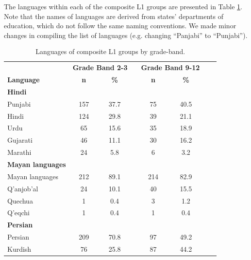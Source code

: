 \documentclass [PhD] {uclathes}
\begin{document}
The languages within each of the composite L1 groups are presented in Table \ref{lang_grp}. Note that the names of languages are derived from states’ departments of education, which do not follow the same naming conventions. We made minor changes in compiling the list of languages (e.g. changing “Panjabi” to “Punjabi”). 

\begin{table}[htbp]
\centering
\caption{\label{lang_grp} Languages of composite L1 groups by grade-band.}
\small  %
\begin{tabular}{lccccccc}
\toprule
    & \multicolumn{2}{c}{\textbf{Grade Band 2-3}} & \multicolumn{1}{c}{ } & \multicolumn{2}{c}{\textbf{Grade Band 9-12}} \\
    \cline{2-3}
    \cline{5-6}
     \textbf{Language} & \textbf{n} & \textbf{\%} & & \textbf{n} & \textbf{\%} \\
    \midrule
\textbf{Hindi} & & & & & \\
\hspace{3mm} Punjabi & 157 & 37.7 & & 75 & 40.5 \\
\hspace{3mm} Hindi & 124 & 29.8 & & 39 & 21.1 \\
\hspace{3mm} Urdu & 65 & 15.6 & & 35 & 18.9 \\
\hspace{3mm} Gujarati & 46 & 11.1 & & 30 & 16.2 \\
\hspace{3mm} Marathi & 24 & 5.8 & & 6 & 3.2 \\
\textbf{Mayan languages} & & & & & \\
\hspace{3mm} Mayan languages & 212 & 89.1 & & 214 & 82.9 \\
\hspace{3mm} Q'anjob'al & 24 & 10.1 & & 40 & 15.5 \\
\hspace{3mm} Quechua & 1 & 0.4 & & 3 & 1.2 \\
\hspace{3mm} Q'eqchi & 1 & 0.4 & & 1 & 0.4 \\
\textbf{Persian} & & & & & \\
\hspace{3mm} Persian & 209 & 70.8 & & 97 & 49.2 \\
\hspace{3mm} Kurdish & 76 & 25.8 & & 87 & 44.2 \\

\end{tabular}
\end{table}
\end{document}
